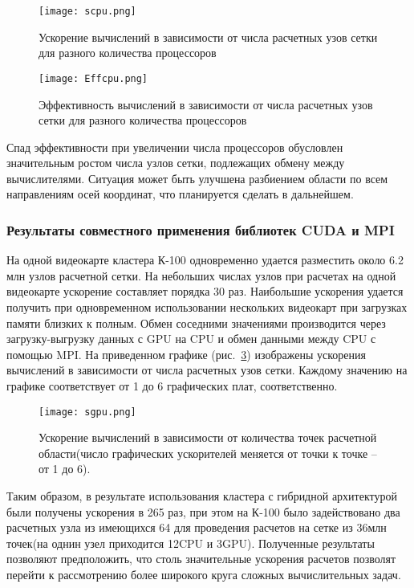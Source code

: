 \begin{figure}[!h]\center
\texttt{[image: scpu.png]} 
\caption{Ускорение вычислений в зависимости от числа расчетных узов сетки для разного количества процессоров}\label{graph1}
\end{figure}
\begin{figure}[!h]\center
\texttt{[image: Effcpu.png]} 
\caption{Эффективность вычислений в зависимости от числа расчетных узов сетки для разного количества процессоров}\label{graph2}
\end{figure}

Спад эффективности при увеличении числа процессоров обусловлен значительным
ростом числа узлов сетки, подлежащих обмену между вычислителями.
Ситуация может быть улучшена разбиением области по всем направлениям осей
координат, что планируется сделать в дальнейшем.

\subsubsection{Результаты совместного применения библиотек CUDA и MPI}
На одной видеокарте кластера К-100 одновременно удается разместить около 6.2 млн узлов
расчетной сетки. На небольших числах узлов при расчетах на одной видеокарте ускорение составляет 
порядка 30 раз. Наибольшие ускорения удается получить при одновременном использовании
нескольких видеокарт при загрузках памяти близких к полным. Обмен соседними значениями
производится через загрузку-выгрузку данных с GPU на CPU и обмен данными между CPU с помощью MPI.
На приведенном графике (рис.~\ref{graph3}) изображены
ускорения вычислений в зависимости от числа расчетных узов сетки. Каждому значению на 
графике соответствует от 1 до 6 графических плат, соответственно.
\begin{figure}[!h]\center
\texttt{[image: sgpu.png]} 
\caption{Ускорение вычислений в зависимости от количества точек расчетной области(число графических ускорителей меняется от точки к точке -- от 1 до 6).}\label{graph3}
\end{figure}

Таким образом, в результате использования кластера с гибридной архитектурой были
получены ускорения в 265 раз, при этом на К-100 было задействовано два расчетных узла 
из имеющихся 64 для проведения расчетов на сетке из 36млн точек(на однин узел
приходится 12CPU и 3GPU).
Полученные результаты позволяют предположить, что столь значительные ускорения
расчетов позволят перейти к рассмотрению более широкого круга сложных
вычислительных задач.
